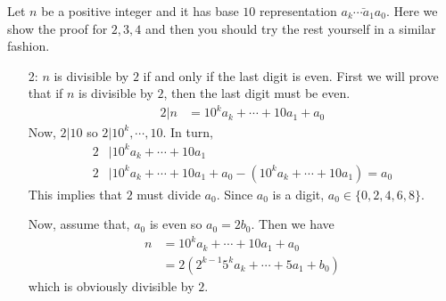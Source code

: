 \documentclass[problems.tex]{subfile}
\begin{document}
	\begin{solution}
		Let $n$ be a positive integer and it has base $10$ representation $\bar{a_k\cdots a_1a_0}$. Here we show the proof for $2,3,4$ and then you should try the rest yourself in a similar fashion.
			\begin{enumerate}
				\item[2:] $n$ is divisible by $2$ if and only if the last digit is even. First we will prove that if $n$ is divisible by $2$, then the last digit must be even.
						\begin{align*}
							2|n & = 10^ka_k+\cdots+10a_1+a_0
						\end{align*}
					Now, $2|10$ so $2|10^k,\cdots,10$. In turn,
						\begin{align*}
							2 & |10^ka_k+\cdots+10a_1\\
							2 & |10^ka_k+\cdots+10a_1+a_0-(10^ka_k+\cdots+10a_1)=a_0
						\end{align*}
					This implies that $2$ must divide $a_0$. Since $a_0$ is a digit, $a_0\in\{0,2,4,6,8\}$.
					
					Now, assume that, $a_0$ is even so $a_0=2b_0$. Then we have
						\begin{align*}
							n & = 10^ka_k+\cdots+10a_1+a_0\\
							  & = 2(2^{k-1}5^ka_k+\cdots+5a_1+b_0)
						\end{align*}
					which is obviously divisible by $2$.
					

\end{enumerate}
\end{solution}
\end{document}
